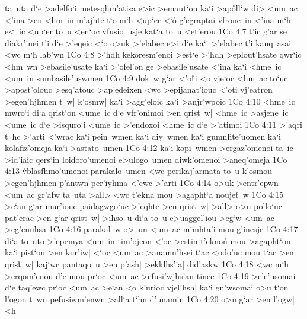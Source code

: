 ta~uta
d`e
>adelfo`i
metesqhm'atisa
e>ic
>emaut`on
ka`i
>ap\r{o}ll`w
di>
<um~ac
<'ina
>en
<hm~in
m'ajhte
t`o
m`h
<up`er
<`o\r{}
g'egraptai
vfrone~in
<'ina
m`h
e<~ic
<up`er
to~u
<en`oc
\r{vf}usio~usje
kat`a
to~u
<et'erou\bibvsend
\vs 1Co 4:7
t'ic
g'ar
se
diakr'inei
t'i
d`e
>'eqeic
<`o
o>uk
>'elabec
e>i
d`e
ka`i
>'elabec
t'i
kauq~asai
<wc
m`h
lab'wn\bibvsend
\vs 1Co 4:8
>'hdh
kekoresm'enoi
>est`e
>'hdh
>eplout'hsate
qwr`ic
<hm~wn
>ebasile'usate
ka`i
>'ofel'on
ge
>ebasile'usate
<'ina
ka`i
<hme~ic
<um~in
sumbasile'uswmen\bibvsend
\vs 1Co 4:9
dok~w
g`ar
<'o\r{t}i
<o
vje`oc
<hm~ac
to`uc
>apost'olouc
>esq'atouc
>ap'edeixen
<wc
>epijanat'iouc
<'oti
vj'eatron
>egen'hjhmen
t~w|
k'osmw|
ka`i
>agg'eloic
ka`i
>anjr'wpoic\bibvsend
\vs 1Co 4:10
<hme~ic
mwro`i
di`a
qrist`on
<ume~ic
d`e
vfr'onimoi
>en
qrist~w|
<hme~ic
>asjene~ic
<ume~ic
d`e
>isquro`i
<ume~ic
>'endoxoi
<hme~ic
d`e
>'atimoi\bibvsend
\vs 1Co 4:11
>'aqri
t~hc
>'arti
<'wrac
ka`i
pein~wmen
ka`i
diy~wmen
ka`i
gumn\r{h}te'uomen
ka`i
kolafiz'omeja
ka`i
>astato~umen\bibvsend
\vs 1Co 4:12
ka`i
kopi~wmen
>ergaz'omenoi
ta~ic
>id'iaic
qers`in
loidoro'umenoi
e>ulogo~umen
diwk'omenoi
>aneq'omeja\bibvsend
\vs 1Co 4:13
\r{vb}lasfhmo'umenoi
parakalo~umen
<wc
perikaj'armata
to~u
k'osmou
>egen'hjhmen
p'antwn
per'iyhma
<'ewc
>'arti\bibvsend
\vs 1Co 4:14
o>uk
>entr'epwn
<um~ac
gr'afw
ta~uta
>all>
<wc
t'ekna
mou
>agapht`a
nouje\r{t}~w\bibvsend
{}
\vs 1Co 4:15
>e`an
g`ar
mur'iouc
paidagwgo`uc
>'eqhte
>en
qrist~w|
>all>
o>u
pollo`uc
pat'erac
>en
g`ar
qrist~w|
>ihso~u
di`a
to~u
e>uaggel'iou
>eg`w
<um~ac
>eg'ennhsa\bibvsend
\vs 1Co 4:16
parakal~w
o>~un
<um~ac
mimhta'i
mou
g'inesje\bibvsend
\vs 1Co 4:17
di`a
to~uto
>'epemya
<um~in
tim'ojeon
<'oc
>estin
t'eknon\r{}
mou
>agapht`on
ka`i
pist`on
>en
kur'iw|
<`oc
<um~ac
>anamn'hsei
t`ac
<odo'uc
mou
t`ac
>en
qris\r{t}~w|
kaj`wc
pantaqo~u
>en
p'ash|
>ekklhs'ia|
did'askw\bibvsend
\vs 1Co 4:18
<wc
m`h
>erqom'enou
d'e
mou
pr`oc
<um~ac
>efusi'wjhs'an
tinec\bibvsend
\vs 1Co 4:19
>ele'usomai
d`e
taq'ewc
pr`oc
<um~ac
>e`an
<o
k'urioc
vjel'hsh|
ka`i
gn'wsomai
o>u
t`on
l'ogon
t~wn
pefusiwm'enwn
>all`a
t`hn
d'unamin\bibvsend
\vs 1Co 4:20
o>u
g`ar
>en
l'ogw|
<h
